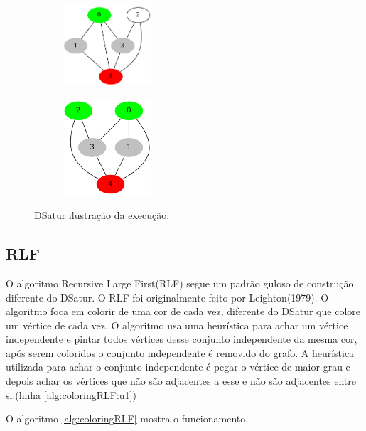 \documentclass[12pt]{article}
\begin{document}
\begin{center}
\begin{figure}
\begin{subfigure}[b]{.33\linewidth}
\centering
\includegraphics[width=3.3cm]{DSaturFuncionamento5}
\end{subfigure}
\begin{subfigure}[b]{.33\linewidth}
\centering
\includegraphics[width=3.3cm]{DSaturFuncionamento6}
\end{subfigure}
\caption{DSatur ilustração da execução.}\label{fig:dsaturfuncionamento}
\end{figure}
\end{center}



\subsection{RLF}
\label{sec:org7da5648}

O algoritmo Recursive Large First(RLF) segue um padrão guloso de construção diferente do DSatur. O RLF foi originalmente feito por Leighton(1979). O algoritmo foca em colorir de uma cor de cada vez, diferente do DSatur que colore um vértice de cada vez.
O algoritmo usa uma heurística para achar um vértice independente e pintar todos vértices desse conjunto independente da mesma cor, após serem coloridos o conjunto independente é removido do grafo. A heurística utilizada para achar o conjunto independente é pegar o vértice de maior grau e depois achar os vértices que não são adjacentes a esse e não são adjacentes entre si.(linha \ref{alg:coloringRLF:u1})

O algoritmo \ref{alg:coloringRLF} mostra o funcionamento.
\end{document}
